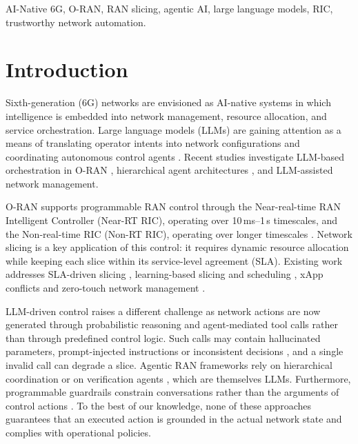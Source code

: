 \documentclass[conference]{IEEEtran}
\begin{document}
\begin{IEEEkeywords}
AI-Native 6G, O-RAN, RAN slicing, agentic AI, large language models, RIC, trustworthy network automation.
\end{IEEEkeywords}













\section{Introduction}
Sixth-generation (6G) networks are envisioned as AI-native systems in which intelligence is embedded into network management, resource allocation, and service orchestration. Large language models (LLMs) are gaining attention as a means of translating operator intents into network configurations and coordinating autonomous control agents \cite{maatouk2025llm,zhou2024llmtelecom,yao2023react}. Recent studies investigate LLM-based orchestration in O-RAN \cite{li2026llmoran}, hierarchical agent architectures \cite{elkael2025agentran,navidan2026multiscale}, and LLM-assisted network management.

O-RAN supports programmable RAN control through the Near-real-time RAN Intelligent Controller (Near-RT RIC), operating over 10\,ms--1\,s timescales, and the Non-real-time RIC (Non-RT RIC), operating over longer timescales \cite{polese2023oran,bonati2021intelligence}. Network slicing is a key application of this control: it requires dynamic resource allocation while keeping each slice within its service-level agreement (SLA). Existing work addresses SLA-driven slicing \cite{dai2025oranslicing}, learning-based slicing and scheduling \cite{polese2023coloran}, xApp conflicts \cite{adamczyk2023conflict} and zero-touch network management \cite{benzaid2020zsm}.

LLM-driven control raises a different challenge as network actions are now generated through probabilistic reasoning and agent-mediated tool calls rather than through predefined control logic. Such calls may contain hallucinated parameters, prompt-injected instructions or inconsistent decisions \cite{ji2023hallucination,greshake2023injection}, and a single invalid call can degrade a slice. Agentic RAN frameworks rely on hierarchical coordination or on verification agents \cite{elkael2025agentran,navidan2026multiscale,singh2025assurance}, which are themselves LLMs. Furthermore, programmable guardrails constrain conversations rather than the arguments of control actions \cite{rebedea2023nemo}. To the best of our knowledge, none of these approaches guarantees that an executed action is grounded in the actual network state and complies with operational policies.
\end{document}
